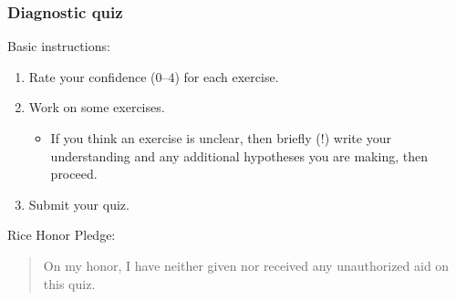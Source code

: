 \documentclass[blue]{beamer}
\begin{document}
\begin{frame}
\frametitle{Diagnostic quiz}

Basic instructions:
\begin{enumerate}
    \item Rate your confidence ($0$--$4$) for each exercise.
    \item Work on some exercises.
    \begin{itemize}
        \item If you think an exercise is unclear, then briefly (!) write your understanding and any additional hypotheses you are making, then proceed.
    \end{itemize}
    \item Submit your quiz.
\end{enumerate}

\vspace{0.25in}

Rice Honor Pledge:
\begin{quotation}
\noindent{}On my honor, I have neither given nor received any unauthorized aid on this quiz.
\end{quotation}
\end{frame}
\end{document}
